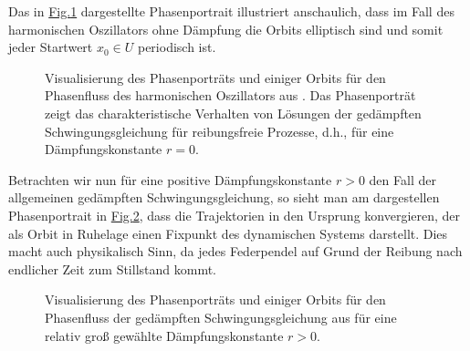 \documentclass[letterpaper,10pt,english]{jupyterBook}
\begin{document}
\sphinxAtStartPar
Das in \hyperref[\detokenize{ode/fluesse:fig-harmonic-oscillator}]{Fig.\@ \ref{\detokenize{ode/fluesse:fig-harmonic-oscillator}}} dargestellte Phasenportrait illustriert anschaulich, dass im Fall des harmonischen Oszillators ohne Dämpfung die Orbits elliptisch sind und somit jeder Startwert \(x_0 \in U\) periodisch ist.

\begin{figure}[htbp]
\centering
\capstart

\noindent{}
\caption{Visualisierung des Phasenporträts und einiger Orbits für den Phasenfluss des harmonischen Oszillators aus {\hyperref[\detokenize{ode/fluesse:ex:oscillations}]{}}. Das Phasenporträt zeigt das charakteristische Verhalten von Lösungen der gedämpften Schwingungsgleichung für reibungsfreie Prozesse, d.h., für eine Dämpfungskonstante \(r = 0\).}\label{\detokenize{ode/fluesse:fig-harmonic-oscillator}}\end{figure}

\sphinxAtStartPar
Betrachten wir nun für eine positive Dämpfungskonstante \(r > 0\) den Fall der allgemeinen gedämpften Schwingungsgleichung, so sieht man am dargestellen Phasenportrait in \hyperref[\detokenize{ode/fluesse:fig-damped-oscillator}]{Fig.\@ \ref{\detokenize{ode/fluesse:fig-damped-oscillator}}}, dass die Trajektorien in den Ursprung konvergieren, der als Orbit in Ruhelage einen Fixpunkt des dynamischen Systems darstellt.
Dies macht auch physikalisch Sinn, da jedes Federpendel auf Grund der Reibung nach endlicher Zeit zum Stillstand kommt.

\begin{figure}[htbp]
\centering
\capstart

\noindent{}
\caption{Visualisierung des Phasenporträts und einiger Orbits für den Phasenfluss der gedämpften Schwingungsgleichung aus {\hyperref[\detokenize{ode/fluesse:ex:oscillations}]{}} für eine relativ groß gewählte Dämpfungskonstante \(r > 0\).}\label{\detokenize{ode/fluesse:fig-damped-oscillator}}\end{figure}
\end{document}
